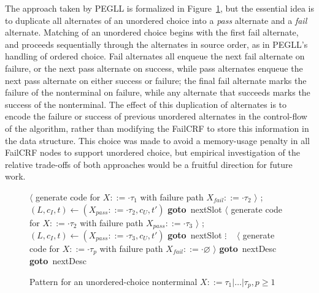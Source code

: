 \documentclass{article}
\newcommand{\fail}{\mathsf{fail}}
\newcommand{\Goto}[1]{\textbf{goto}~#1}
\begin{document}
The approach taken by PEGLL is formalized in Figure~\ref{unordered-choice-algo}, but the essential idea is to duplicate all alternates of an unordered choice into a \emph{pass} alternate and a \emph{fail} alternate. 
Matching of an unordered choice begins with the first fail alternate, and proceeds sequentially through the alternates in source order, as in PEGLL's handling of ordered choice. 
Fail alternates all enqueue the next fail alternate on failure, or the next pass alternate on success, while pass alternates enqueue the next pass alternate on either success or failure; the final fail alternate marks the failure of the nonterminal on failure, while any alternate that succeeds marks the success of the nonterminal.
The effect of this duplication of alternates is to encode the failure or success of previous unordered alternates in the control-flow of the algorithm, rather than modifying the FailCRF to store this information in the data structure. 
This choice was made to avoid a memory-usage penalty in all FailCRF nodes to support unordered choice, but empirical investigation of the relative trade-offs of both approaches would be a fruitful direction for future work.

\begin{figure}
	\caption[Unordered choice code pattern]{Pattern for an unordered-choice nonterminal $X ::= \tau_1 | \ldots | \tau_p, p \geq 1$} \label{unordered-choice-algo}
	\begin{algorithmic}
		\State $\langle$ generate code for $X ::= \cdot \tau_1$ with failure path $X_{fail} ::= \cdot \tau_2$ $\rangle$
		\State {}; 
		\State $(L, c_I, t) \gets (X_{pass} ::= \cdot \tau_2, c_U, t')$ \Goto{nextSlot}
	\EndCase
		\State $\langle$ generate code for $X ::= \cdot \tau_2$ with failure path $X_{pass} ::= \cdot \tau_3$ $\rangle$
		\State {}; 
		\State $(L, c_I, t) \gets (X_{pass} ::= \cdot \tau_3, c_U, t')$ \Goto{nextSlot}
	\EndCase
	\State $\vdots$
	\State ~
		\State $\langle$ generate code for $X ::= \cdot \tau_p$ with failure path $X_{fail} ::= \cdot \varnothing$ $\rangle$
		\State {} \Goto{nextDesc}
	\EndCase
		\State \Call{rtn}{$X$, $c_U$, $\fail$} \Goto{nextDesc}
	\EndCase
	\end{algorithmic}
	\end{figure}
\end{document}
